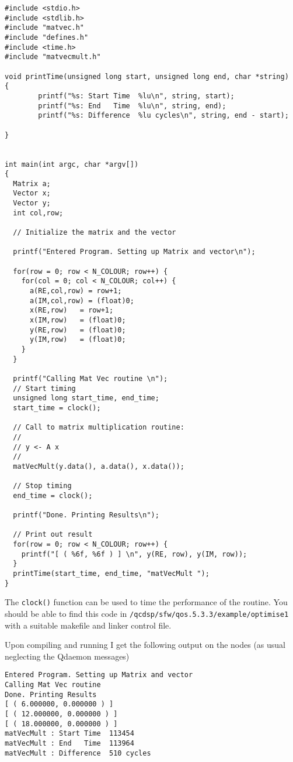 {\scriptsize
\begin{verbatim}
#include <stdio.h>
#include <stdlib.h>
#include "matvec.h"
#include "defines.h"
#include <time.h>
#include "matvecmult.h"

void printTime(unsigned long start, unsigned long end, char *string)
{
        printf("%s: Start Time  %lu\n", string, start);
        printf("%s: End   Time  %lu\n", string, end);
        printf("%s: Difference  %lu cycles\n", string, end - start);

} 
  
   
int main(int argc, char *argv[]) 
{
  Matrix a;
  Vector x;
  Vector y; 
  int col,row;

  // Initialize the matrix and the vector 

  printf("Entered Program. Setting up Matrix and vector\n");

  for(row = 0; row < N_COLOUR; row++) {
    for(col = 0; col < N_COLOUR; col++) {
      a(RE,col,row) = row+1;
      a(IM,col,row) = (float)0;
      x(RE,row)   = row+1;
      x(IM,row)   = (float)0;
      y(RE,row)   = (float)0;
      y(IM,row)   = (float)0;
    }
  }

  printf("Calling Mat Vec routine \n");
  // Start timing
  unsigned long start_time, end_time;
  start_time = clock();

  // Call to matrix multiplication routine:
  // 
  // y <- A x 
  // 
  matVecMult(y.data(), a.data(), x.data());

  // Stop timing
  end_time = clock();
  
  printf("Done. Printing Results\n");

  // Print out result 
  for(row = 0; row < N_COLOUR; row++) {
    printf("[ ( %6f, %6f ) ] \n", y(RE, row), y(IM, row));
  }
  printTime(start_time, end_time, "matVecMult ");
}
\end{verbatim}}

The {\tt clock()} function can be used to time the performance of the 
routine. You should be able to find this code in {\tt /qcdsp/sfw/qos.5.3.3/example/optimise1} with a suitable makefile and linker control file.

Upon compiling and running I get the following output on the nodes
(as usual neglecting the Qdaemon messages)

\begin{verbatim}
Entered Program. Setting up Matrix and vector
Calling Mat Vec routine 
Done. Printing Results
[ ( 6.000000, 0.000000 ) ] 
[ ( 12.000000, 0.000000 ) ] 
[ ( 18.000000, 0.000000 ) ] 
matVecMult : Start Time  113454
matVecMult : End   Time  113964
matVecMult : Difference  510 cycles
\end{verbatim}


